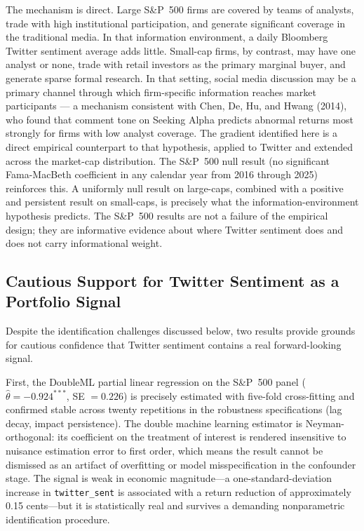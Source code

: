 The mechanism is direct. Large S\&P~500 firms are covered by teams of analysts, trade with high institutional
participation, and generate significant coverage in the traditional media. In that
information environment, a daily Bloomberg Twitter sentiment average adds
little. Small-cap firms, by contrast, may have one analyst or
none, trade with retail investors as the primary marginal buyer, and generate
sparse formal research. In that setting, social media discussion may be a
primary channel through which firm-specific information reaches market
participants --- a mechanism consistent with Chen, De, Hu, and Hwang (2014), who found
that comment tone on Seeking Alpha predicts abnormal returns most strongly for
firms with low analyst coverage. The gradient identified here is a direct
empirical counterpart to that hypothesis, applied to Twitter and extended
across the market-cap distribution. The S\&P~500 null result (no significant Fama-MacBeth coefficient in any
calendar year from 2016 through 2025) reinforces this. A uniformly null result on large-caps, combined with a positive and
persistent result on small-caps, is precisely what the information-environment
hypothesis predicts. The S\&P~500 results are not a failure of the empirical
design; they are informative evidence about where Twitter sentiment does and
does not carry informational weight.

\subsection{Cautious Support for Twitter Sentiment as a Portfolio Signal}\label{portfolio-signal}

Despite the identification challenges discussed below, two results provide
grounds for cautious confidence that Twitter sentiment contains a real
forward-looking signal.

First, the DoubleML partial linear regression on the S\&P~500 panel
($\hat{\theta} = -0.924^{***}$, SE $= 0.226$) is precisely estimated with
five-fold cross-fitting and confirmed stable across twenty repetitions in
the robustness specifications (lag decay, impact persistence). The double
machine learning estimator is Neyman-orthogonal: its coefficient on the
treatment of interest is rendered insensitive to nuisance estimation error
to first order, which means the result cannot be dismissed as an artifact of
overfitting or model misspecification in the confounder stage. The signal is
weak in economic magnitude---a one-standard-deviation increase in
\texttt{twitter\_sent} is associated with a return reduction of approximately
0.15 cents---but it is statistically real and survives a demanding
nonparametric identification procedure.

